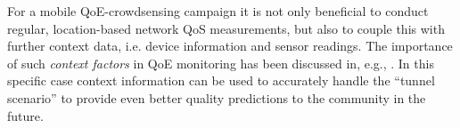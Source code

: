 For a mobile \gls{QoE}-crowdsensing campaign it is not only beneficial to conduct regular, location-based network \gls{QoS} measurements, but also to couple this with further context data, i.e. device information and sensor readings. The importance of such \textit{context factors} in \gls{QoE} monitoring has been discussed in, e.g., \cite{7140480}. In this specific case context information can be used to accurately handle the ``tunnel scenario'' \cite{7511206,Metzger2016246} to provide even better quality predictions to the community in the future.







